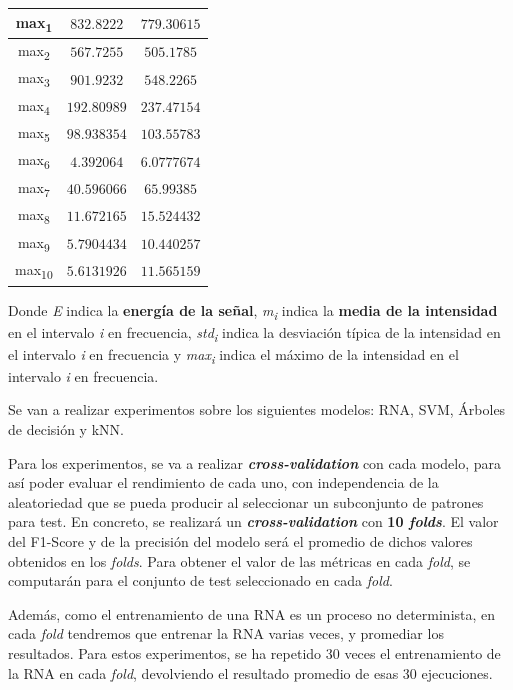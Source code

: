 \documentclass[12pt]{article}
\begin{document}
\begin{table}[h!]
\begin{tabular}{||c c c||}
			\hline
			max\textsubscript{1} & $832.8222$ & $779.30615$ \\
			\hline
			max\textsubscript{2} & $567.7255$ & $505.1785$ \\
			\hline
			max\textsubscript{3} & $901.9232$ & $548.2265$ \\
			\hline
			max\textsubscript{4} & $192.80989$ & $237.47154$ \\
			\hline
			max\textsubscript{5} & $98.938354$ & $103.55783$ \\
			\hline
			max\textsubscript{6} & $4.392064$ & $6.0777674$ \\
			\hline
			max\textsubscript{7} & $40.596066$ & $65.99385$ \\
			\hline
			max\textsubscript{8} & $11.672165$ & $15.524432$ \\
			\hline
			max\textsubscript{9} & $5.7904434$ & $10.440257$ \\
			\hline
			max\textsubscript{10} & $5.6131926$ & $11.565159$ \\
			\hline
		\end{tabular}
	\label{Tab:Features}
\end{table}
Donde \textit{E} indica la \textbf{energía de la señal}, \textit{m\textsubscript{i}} indica la \textbf{media de la intensidad} en el intervalo \textit{i} en frecuencia, 
\textit{std\textsubscript{i}} indica la {desviación típica de la intensidad} en el intervalo \textit{i} en frecuencia
y \textit{max\textsubscript{i}} indica el máximo de la intensidad en el intervalo \textit{i} en frecuencia.  

\newpage
Se van a realizar experimentos sobre los siguientes modelos: RNA, SVM, Árboles de decisión y kNN.

\bigskip
Para los experimentos, se va a realizar \textbf{\textit{cross-validation}} con cada modelo, para así poder evaluar el rendimiento
de cada uno, con independencia de la aleatoriedad que se pueda producir al seleccionar un subconjunto de patrones para test.
En concreto, se realizará un \textbf{\textit{cross-validation}} con \textbf{10 \textit{folds}}. El valor del F1-Score y de la precisión
del modelo será el promedio de dichos valores obtenidos en los \textit{folds}. Para obtener el valor de las métricas en cada \textit{fold}, 
se computarán para el conjunto de test seleccionado en cada \textit{fold}.

\bigskip
Además, como el entrenamiento de una RNA es un proceso no determinista, en cada \textit{fold}
tendremos que entrenar la RNA varias veces, y promediar los resultados. Para estos experimentos,
se ha repetido 30 veces el entrenamiento de la RNA en cada \textit{fold}, devolviendo el resultado promedio de esas 30 ejecuciones.
\end{document}
